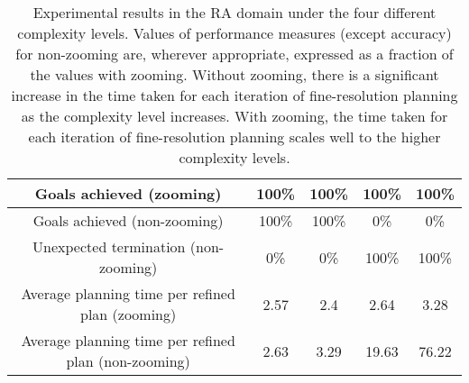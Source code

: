 \documentclass[11pt, oneside]{article}
\begin{document}
\begin{table*}[t]
\begin{tabular}{|c|c|c|c|c|}
    Goals achieved (zooming) & 100\% & 100\% & 100\% & 100\%\\ \hline
    Goals achieved (non-zooming) & 100\% & 100\% & 0\% & 0\%\\ \hline
    Unexpected termination (non-zooming) & 0\% & 0\% & 100\% & 100\%\\ \hhline{|=|=|=|=|=|}
    Average planning time per refined plan (zooming) & 2.57 & 2.4 & 2.64 & 3.28 \\ \hline
    Average planning time per refined plan (non-zooming) & 2.63 & 3.29 & 19.63 & 76.22 \\ \hline
  \end{tabular}
  \caption[Results2]{Experimental results in the RA domain under the four different complexity levels. Values of performance measures (except accuracy) for non-zooming are, wherever appropriate, expressed as a fraction of the values with zooming. Without zooming, there is a significant increase in the time taken for each iteration of fine-resolution planning as the complexity level increases. With zooming, the time taken for each iteration of fine-resolution planning scales well to the higher complexity levels.}
  \label{tab:sim-zoom-results}
\end{table*}
\end{document}
